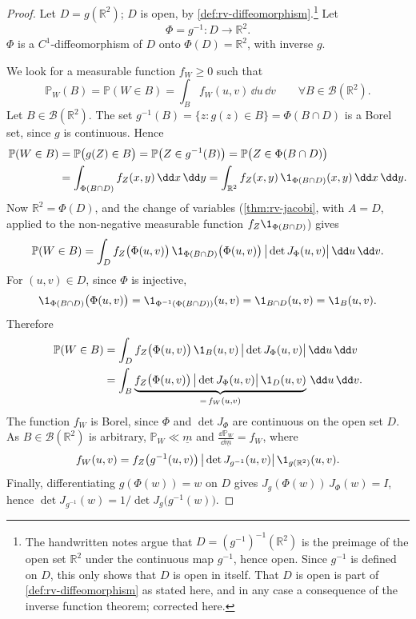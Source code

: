 \begin{proof}
Let $D=g(\mathbb R^2)$; $D$ is open, by \cref{def:rv-diffeomorphism}.\footnote{The handwritten notes
argue that $D=(g^{-1})^{-1}(\mathbb R^2)$ is the preimage of the open set $\mathbb R^2$ under the
continuous map $g^{-1}$, hence open. Since $g^{-1}$ is defined on $D$, this only shows that $D$ is
open in itself. That $D$ is open is part of \cref{def:rv-diffeomorphism} as stated here, and in any
case a consequence of the inverse function theorem; corrected here.} Let
\[
  \Phi=g^{-1}:D\longrightarrow\mathbb R^2 .
\]
$\Phi$ is a $C^1$-diffeomorphism of $D$ onto $\Phi(D)=\mathbb R^2$, with inverse $g$.

We look for a measurable function $f_W\ge0$ such that
\[
  \mathbb P_W(B)=\mathbb P(W\in B)=\int_Bf_W(u,v)\,\dd u\,\dd v\qquad\forall B\in\mathcal B(\mathbb R^2).
\]
Let $B\in\mathcal B(\mathbb R^2)$. The set $g^{-1}(B)=\{z:g(z)\in B\}=\Phi(B\cap D)$ is a Borel set,
since $g$ is continuous. Hence
\[
\begin{aligned}
  \mathbb P(W\in B)&=\mathbb P\big(g(Z)\in B\big)=\mathbb P\big(Z\in g^{-1}(B)\big)=\mathbb P\big(Z\in\Phi(B\cap D)\big)\\
  &=\int_{\Phi(B\cap D)}f_Z(x,y)\,\dd x\,\dd y=\int_{\mathbb R^2}f_Z(x,y)\,\1_{\Phi(B\cap D)}(x,y)\,\dd x\,\dd y .
\end{aligned}
\]
Now $\mathbb R^2=\Phi(D)$, and the change of variables (\cref{thm:rv-jacobi}, with $A=D$, applied to
the non-negative measurable function $f_Z\1_{\Phi(B\cap D)}$) gives
\[
  \mathbb P(W\in B)=\int_Df_Z\big(\Phi(u,v)\big)\,\1_{\Phi(B\cap D)}\big(\Phi(u,v)\big)\,
  \big|\det J_\Phi(u,v)\big|\,\dd u\,\dd v .
\]
For $(u,v)\in D$, since $\Phi$ is injective,
\[
  \1_{\Phi(B\cap D)}\big(\Phi(u,v)\big)=\1_{\Phi^{-1}(\Phi(B\cap D))}(u,v)=\1_{B\cap D}(u,v)=\1_B(u,v).
\]
Therefore
\[
\begin{aligned}
  \mathbb P(W\in B)&=\int_Df_Z\big(\Phi(u,v)\big)\,\1_B(u,v)\,\big|\det J_\Phi(u,v)\big|\,\dd u\,\dd v\\
  &=\int_B\underbrace{f_Z\big(\Phi(u,v)\big)\,\big|\det J_\Phi(u,v)\big|\,\1_D(u,v)}_{=\,f_W(u,v)}\,\dd u\,\dd v .
\end{aligned}
\]
The function $f_W$ is Borel, since $\Phi$ and $\det J_\Phi$ are continuous on the open set $D$. As
$B\in\mathcal B(\mathbb R^2)$ is arbitrary, $\mathbb P_W\ll\underline m$ and
$\frac{\dd\mathbb P_W}{\dd\underline m}=f_W$, where
\[
  f_W(u,v)=f_Z\big(g^{-1}(u,v)\big)\,\big|\det J_{g^{-1}}(u,v)\big|\,\1_{g(\mathbb R^2)}(u,v).
\]
Finally, differentiating $g(\Phi(w))=w$ on $D$ gives $J_g(\Phi(w))\,J_\Phi(w)=I$, hence
$\det J_{g^{-1}}(w)=1/\det J_g\big(g^{-1}(w)\big)$.
\end{proof}

